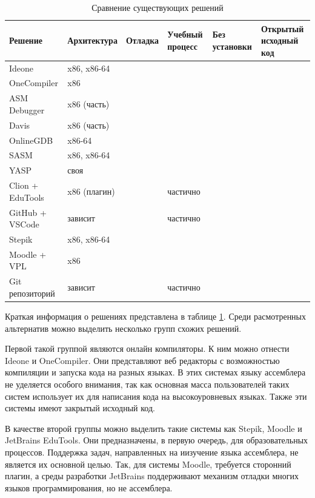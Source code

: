 \documentclass[a4paper,article,14pt]{extarticle}
\newcommand*\CHECK{\ding{51}}
\begin{document}
\begin{table}[ht]
\small
    \begin{tabular}{p{3.1cm}p{2.4cm}p{2cm}p{2cm}p{2cm}p{2cm}}
    \toprule
    Решение & Архитектура & Отладка & Учебный процесс & Без установки & Открытый исходный код \\
    \midrule
    Ideone & x86, x86-64 & & & \CHECK & \\
    OneCompiler & x86 & & & \CHECK & \\
    ASM Debugger & x86 (часть) & \CHECK & & \CHECK & \CHECK \\
    Davis & x86 (часть) & \CHECK & & \CHECK & \CHECK \\
    OnlineGDB & x86-64 & \CHECK & \CHECK & \CHECK & \\
    SASM & x86, x86-64 & \CHECK & & & \CHECK \\
    YASP & своя & \CHECK & & \CHECK & \CHECK \\
    Clion + EduTools & x86 (плагин) & & частично & & \\
    GitHub + VSCode & зависит & & частично & & \\
    Stepik & x86, x86-64 & & \CHECK & \CHECK & \\
    Moodle + VPL & x86 & & \CHECK & \CHECK & \CHECK \\
    Git репозиторий & зависит & & частично & & \\
    \bottomrule
    \end{tabular}
\caption{\label{table:alternatives}Сравнение существующих решений}
\normalsize
\end{table}

Краткая информация о решениях представлена в таблице \ref{table:alternatives}. Среди расмотренных альтернатив можно выделить несколько групп схожих решений.

Первой такой группой являются онлайн компиляторы. К ним можно отнести Ideone и OneCompiler. Они представляют веб редакторы с возможностью компиляции и запуска кода на разных языках. В этих системах языку ассемблера не уделяется особого внимания, так как основная масса пользователей таких систем использует их для написания кода на высокоуровневых языках. Также эти системы имеют закрытый исходный код.

В качестве второй группы можно выделить такие системы как Stepik, Moodle и JetBrains EduTools. Они предназначены, в первую очередь, для образовательных процессов. Поддержка задач, направленных на иизучение языка ассемблера, не является их основной целью. Так, для системы Moodle, требуется сторонний плагин, а среды разработки JetBrains поддерживают механизм отладки многих языков программирования, но не ассемблера.
\end{document}
